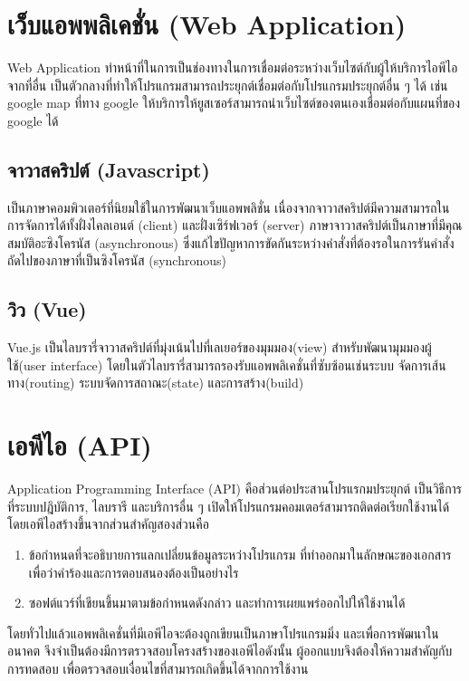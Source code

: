 \section{เว็บแอพพลิเคชั่น (Web Application)} 
Web Application \cite{margaret} ทำหน้าที่ในการเป็นช่องทางในการเชื่อมต่อระหว่างเว็บไซต์กับผู้ให้บริการไอพีไอจากที่อื่น เป็นตัวกลางที่ทำให้โปรแกรมสามารถประยุกต์เชื่อมต่อกับโปรแกรมประยุกต์อื่น ๆ ได้ เช่น google map ที่ทาง google ให้บริการให้ยูสเซอร์สามารถนำเว็บไซต์ของตนเองเชื่อมต่อกับแผนที่ของ google ได้

\subsection{จาวาสคริปต์ (Javascript)}
เป็นภาษาคอมพิวเตอร์ที่นิยมใช้ในการพัฒนาเว็บแอพพลิชั่น เนื่องจากจาวาสคริปต์มีความสามารถในการจัดการได้ทั้งฝั่งไคลเอนต์ (client) และฝั่งเซิร์ฟเวอร์ (server) ภาษาจาวาสคริปต์เป็นภาษาที่มีคุณสมบัติอะซิงโครนัส (asynchronous) ซึ่งแก้ไขปัญหาการขัดกันระหว่างคำสั่งที่ต้องรอในการรันคำสั่งถัดไปของภาษาที่เป็นซิงโครนัส (synchronous)

\subsection{วิว (Vue)}
Vue.js เป็นไลบรารี่จาวาสคริปต์ที่มุ่งเน้นไปที่เลเยอร์ของมุมมอง(view) สำหรับพัฒนามุมมองผู้ใช้(user interface) โดยในตัวไลบรารี่สามารถรองรับแอพพลิเคชั่นที่ซับซ้อนเช่นระบบ จัดการเส้นทาง(routing) ระบบจัดการสถาณะ(state) และการสร้าง(build)

\section{เอพีไอ (API)}
  Application Programming Interface (API) \cite{wiki api} คือส่วนต่อประสานโปรแรกมประยุกต์ เป็นวิธีการที่ระบบปฎิบัติการ, ไลบรารี และบริการอื่น ๆ เปิดให้โปรแกรมคอมเตอร์สามารถติดต่อเรียกใช้งานได้ โดยเอพีไอสร้างขึ้นจากส่วนสำคัญสองส่วนคือ
  \begin{enumerate}
    \item ข้อกำหนดที่จะอธิบายการแลกเปลี่ยนข้อมูลระหว่างโปรแกรม ที่ทำออกมาในลักษณะของเอกสาร เพื่อว่าคำร้องและการตอบสนองต้องเป็นอย่างไร
    \item ซอฟต์แวร์ที่เขียนขึ้นมาตามข้อกำหนดดังกล่าว และทำการเผยแพร่ออกไปให้ใช้งานได้
  \end{enumerate}
  
  โดยทั่วไปแล้วแอพพลิเคชั่นที่มีเอพีไอจะต้องถูกเขียนเป็นภาษาโปรแกรมมิ่ง และเพื่อการพัฒนาในอนาคต จึงจำเป็นต้องมีการตรวจสอบโครงสร้างของเอพีไอดังนั้น ผู้ออกแบบจึงต้องให้ความสำคัญกับการทดสอบ เพื่อตรวจสอบเงื่อนไขที่สามารถเกิดขึ้นได้จากการใช้งาน

